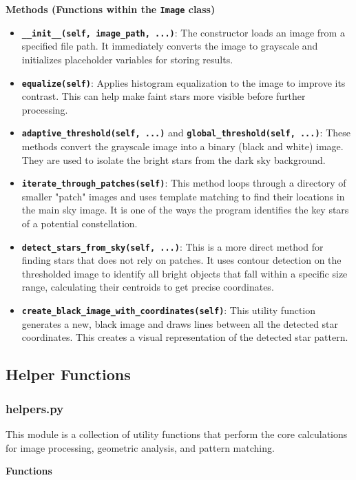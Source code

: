 \documentclass[a4paper,11pt]{article}
\begin{document}
\textbf{Methods (Functions within the \texttt{Image} class)}
\begin{itemize}
	\item \textbf{\texttt{\_\_init\_\_(self, image\_path, ...)}}: The constructor loads an image from a specified file path. It immediately converts the image to grayscale and initializes placeholder variables for storing results.
	\item \textbf{\texttt{equalize(self)}}: Applies histogram equalization to the image to improve its contrast. This can help make faint stars more visible before further processing.
	\item \textbf{\texttt{adaptive\_threshold(self, ...)}} and \textbf{\texttt{global\_threshold(self, ...)}}: These methods convert the grayscale image into a binary (black and white) image. They are used to isolate the bright stars from the dark sky background.
	\item \textbf{\texttt{iterate\_through\_patches(self)}}: This method loops through a directory of smaller "patch" images and uses template matching to find their locations in the main sky image. It is one of the ways the program identifies the key stars of a potential constellation.
	\item \textbf{\texttt{detect\_stars\_from\_sky(self, ...)}}: This is a more direct method for finding stars that does not rely on patches. It uses contour detection on the thresholded image to identify all bright objects that fall within a specific size range, calculating their centroids to get precise coordinates.
	\item \textbf{\texttt{create\_black\_image\_with\_coordinates(self)}}: This utility function generates a new, black image and draws lines between all the detected star coordinates. This creates a visual representation of the detected star pattern.
\end{itemize}

\subsection{Helper Functions}
\subsubsection*{helpers.py}
\hrulefill

This module is a collection of utility functions that perform the core calculations for image processing, geometric analysis, and pattern matching.

\textbf{Functions}
\end{document}
